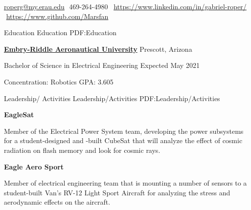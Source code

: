 \documentclass[letterpaper,ddMMMyyyy,nonstopmode]{simpleresumecv}
\makeatletter
\newcommand{\CVAuthor}{Gabriel Roper}
\newcommand{\LinkedInPage}{https://www.linkedin.com/in/gabriel-roper/}
\newcommand{\GithubPage}{https://www.github.com/Marsfan}
\newcommand{\emailAddress}{roperg@my.erau.edu}
\newcommand{\streetAddress}{}
\newcommand{\phoneNumber}{469-264-4980}
\newcommand{\descriptionWidth}{33em}
\newenvironment{Description}
{%
	\SmallGap
	\par
	\begin{Detail}
		\Item
		\begin{minipage}{\descriptionWidth}
}
{\par
\end{minipage}
\end{Detail}
}
\makeatother
\begin{document}
	\Title{\CVAuthor}

	\begin{SubTitle}
		{\streetAddress}
		\par
		\href{mailto:\emailAddress}{\emailAddress}
		\BulletSymbol
		\,\,\phoneNumber\,
		\BulletSymbol
		\,\,\href{\LinkedInPage}{\url{\LinkedInPage}}
		\BulletSymbol
		\,\,\href{\GithubPage}{\url{\GithubPage}}
	\end{SubTitle}

	\begin{Body}


		\Section
		{Education}
		{Education}
		{PDF:Education}

		\Entry
		\href{https://prescott.erau.edu}{\textbf{Embry-Riddle Aeronautical University}}
		\hfill Prescott, Arizona

		Bachelor of Science in Electrical Engineering
		\hfill Expected May 2021

		Concentration: Robotics
		\hfill GPA: 3.605


		\Section
		{Leadership/ Activities}
		{Leadership/Activities}
		{PDF:Leadership/Activities}

		\Entry


		\Entry
		\textbf{EagleSat}
		\hfill

		\begin{Description}
				Member of the Electrical Power System team, developing the power subsystems for a student-designed and -built CubeSat that will analyze the effect of cosmic radiation on flash memory and look for cosmic rays.
		\end{Description}
		\Gap

		\Entry
		\textbf{Eagle Aero Sport}
		\hfill

		\begin{Description}
				Member of electrical engineering team that is mounting a number of sensors to a student-built Van's RV-12 Light Sport Aircraft for analyzing the stress and aerodynamic effects on the aircraft.
		\end{Description}
		\Gap



\end{Body}
\end{document}
